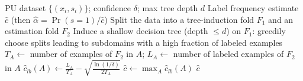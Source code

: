 \documentclass{article}
\begin{document}
\begin{algorithm}[!h]
\renewcommand{\algorithmicrequire}{\textbf{Input:}} %
\renewcommand{\algorithmicensure}{\textbf{Output:}} %
	\caption{TIcE (Tree Induction for c Estimation)} %
	\begin{algorithmic}[1] %
	    \REQUIRE
	    PU dataset $\{(x_i,s_i)\}$; confidence $\delta$; max tree depth $d$
	    \ENSURE
	    Label frequency estimate $\hat{c}$ (then $\hat{\alpha}=\Pr(s=1)/\hat{c}$)
	    \STATE Split the data into a tree-induction fold $F_1$ and an estimation fold $F_2$ %
	    \STATE Induce a shallow decision tree (depth $\leq d$) on $F_1$: greedily choose splits leading to subdomains with a high fraction of labeled examples %
	    \STATE $T_A\leftarrow$ number of examples of $F_2$ in $A$; $L_A\leftarrow$ number of labeled examples of $F_2$ in $A$
	    \STATE $\hat{c}_{lb}(A)\leftarrow \frac{L_A}{T_A}-\sqrt{\frac{\ln(1/\delta)}{2T_A}}$ %
	    \ENDFOR
	    \STATE $\hat{c}\leftarrow \max_{A}\hat{c}_{lb}(A)$
		\RETURN $\hat{c}$
	\end{algorithmic}
\end{algorithm}
\end{document}
